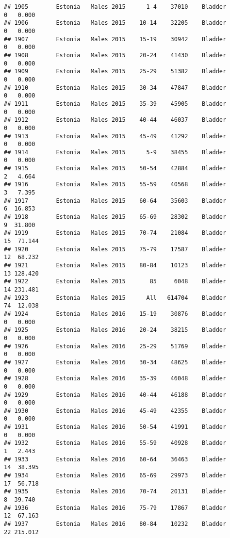 \documentclass[
]{article}
\begin{document}
\begin{verbatim}
## 1905        Estonia   Males 2015      1-4    37010    Bladder      0   0.000
## 1906        Estonia   Males 2015    10-14    32205    Bladder      0   0.000
## 1907        Estonia   Males 2015    15-19    30942    Bladder      0   0.000
## 1908        Estonia   Males 2015    20-24    41430    Bladder      0   0.000
## 1909        Estonia   Males 2015    25-29    51382    Bladder      0   0.000
## 1910        Estonia   Males 2015    30-34    47847    Bladder      0   0.000
## 1911        Estonia   Males 2015    35-39    45905    Bladder      0   0.000
## 1912        Estonia   Males 2015    40-44    46037    Bladder      0   0.000
## 1913        Estonia   Males 2015    45-49    41292    Bladder      0   0.000
## 1914        Estonia   Males 2015      5-9    38455    Bladder      0   0.000
## 1915        Estonia   Males 2015    50-54    42884    Bladder      2   4.664
## 1916        Estonia   Males 2015    55-59    40568    Bladder      3   7.395
## 1917        Estonia   Males 2015    60-64    35603    Bladder      6  16.853
## 1918        Estonia   Males 2015    65-69    28302    Bladder      9  31.800
## 1919        Estonia   Males 2015    70-74    21084    Bladder     15  71.144
## 1920        Estonia   Males 2015    75-79    17587    Bladder     12  68.232
## 1921        Estonia   Males 2015    80-84    10123    Bladder     13 128.420
## 1922        Estonia   Males 2015       85     6048    Bladder     14 231.481
## 1923        Estonia   Males 2015      All   614704    Bladder     74  12.038
## 1924        Estonia   Males 2016    15-19    30876    Bladder      0   0.000
## 1925        Estonia   Males 2016    20-24    38215    Bladder      0   0.000
## 1926        Estonia   Males 2016    25-29    51769    Bladder      0   0.000
## 1927        Estonia   Males 2016    30-34    48625    Bladder      0   0.000
## 1928        Estonia   Males 2016    35-39    46048    Bladder      0   0.000
## 1929        Estonia   Males 2016    40-44    46188    Bladder      0   0.000
## 1930        Estonia   Males 2016    45-49    42355    Bladder      0   0.000
## 1931        Estonia   Males 2016    50-54    41991    Bladder      0   0.000
## 1932        Estonia   Males 2016    55-59    40928    Bladder      1   2.443
## 1933        Estonia   Males 2016    60-64    36463    Bladder     14  38.395
## 1934        Estonia   Males 2016    65-69    29973    Bladder     17  56.718
## 1935        Estonia   Males 2016    70-74    20131    Bladder      8  39.740
## 1936        Estonia   Males 2016    75-79    17867    Bladder     12  67.163
## 1937        Estonia   Males 2016    80-84    10232    Bladder     22 215.012

\end{verbatim}
\end{document}
